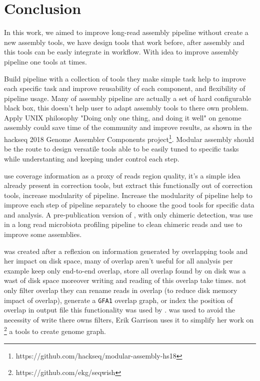 \documentclass[main.tex]{subfiles}
\begin{document}
\chapter{Conclusion}


In this work, we aimed to improve long-read assembly pipeline without create a new assembly tools, we have design tools that work before, after assembly and this tools can be easly integrate in workflow. With idea to improve assembly pipeline one tools at times.

Build pipeline with a collection of tools they make simple task help to improve each specific task and improve reusability of each component, and flexibility of pipeline usage. Many of assembly pipeline are actually a set of hard configurable black box, this doesn't help user to adapt assembly tools to there own problem. Apply UNIX philosophy "Doing only one thing, and doing it well" on genome assembly could save time of the community and improve results, as shown in the hackseq 2018 Genome Assembler Components project\footnote{https://github.com/hackseq/modular-assembly-hs18}. Modular assembly should be the route to design versatile tools able to be easily tuned to specific tasks while understanting and keeping under control each step.

\yacrd use coverage information as a proxy of reads region quality, it's a simple idea already present in correction tools, but extract this functionally out of correction tools, increase modularity of pipeline. Increase the modularity of pipeline help to improve each step of pipeline separately to choose the good tools for specific data and analysis. A pre-publication version of \yacrd, with only chimeric detection, was use in a long read microbiota profiling pipeline to clean chimeric reads \cite{cite_yacrd} and use to improve some \flye assemblies. 

\fpa was created after a reflexion on information generated by overlapping tools and her impact on disk space, many of overlap aren't useful for all analysis per example \miniasm keep only end-to-end overlap, store all overlap found by \minimap on disk was a wast of disk space moreover writing and reading of this overlap take times. \fpa not only filter overlap they can rename reads in overlap (to reduce disk memory impact of overlap), generate a \texttt{GFA1} overlap graph, or index the position of overlap in output file this functionality was used by \consent \cite{CONSENT}. \fpa was used to avoid the necessity of write there owns filters, Erik Garrison uses it to simplify her work on \footnote{https://github.com/ekg/seqwish} a tools to create genome graph.
\end{document}
